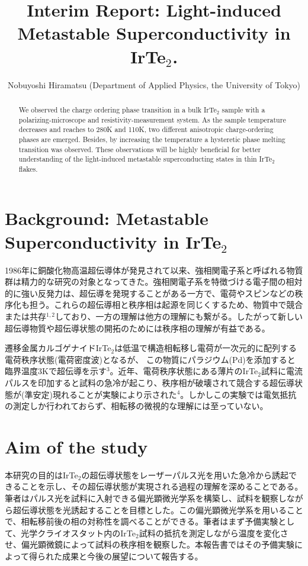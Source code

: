 \documentclass[11pt,a4paper]{article}
\title{\vspace{-1.5zh}Interim Report: Light-induced Metastable Superconductivity in IrTe$_2$.}
\author{\vspace{-2zh}Nobuyoshi Hiramatsu (Department of Applied Physics, the University of Tokyo) }
\date{}
\begin{document}
\maketitle
\thispagestyle{mypagestyle}

\begin{abstract}
We observed the charge ordering phase transition in a bulk IrTe$_2$ sample with a polarizing-microscope and resistivity-measurement system. As the sample temperature decreases and reaches to 280K and 110K, two different anisotropic charge-ordering phases are emerged. Besides, by increasing the temperature a hysteretic phase melting transition was observed. These observations will be highly beneficial for better understanding of the light-induced metastable superconducting states in thin IrTe$_2$ flakes.
\end{abstract}


\section{Background: Metastable Superconductivity in IrTe$_2$}
1986年に銅酸化物高温超伝導体が発見されて以来、強相関電子系と呼ばれる物質群は精力的な研究の対象となってきた。強相関電子系を特徴づける電子間の相対的に強い反発力は、超伝導を発現することがある一方で、電荷やスピンなどの秩序化も担う。これらの超伝導相と秩序相は起源を同じくするため、物質中で競合または共存$^{1,2}$しており、一方の理解は他方の理解にも繋がる。したがって新しい超伝導物質や超伝導状態の開拓のためには秩序相の理解が有益である。

遷移金属カルゴゲナイドIrTe$_2$は低温で構造相転移し電荷が一次元的に配列する電荷秩序状態(電荷密度波)となるが、
この物質にパラジウム(Pd)を添加すると臨界温度3Kで超伝導を示す$^3$。近年、電荷秩序状態にある薄片のIrTe$_2$試料に電流パルスを印加すると試料の急冷が起こり、秩序相が破壊されて競合する超伝導状態が(準安定)現れることが実験により示された$^4$。しかしこの実験では電気抵抗の測定しか行われておらず、相転移の微視的な理解には至っていない。

\section{Aim of the study}
本研究の目的はIrTe$_2$の超伝導状態をレーザーパルス光を用いた急冷から誘起できることを示し、その超伝導状態が実現される過程の理解を深めることである。筆者はパルス光を試料に入射できる偏光顕微光学系を構築し、試料を観察しながら超伝導状態を光誘起することを目標とした。この偏光顕微光学系を用いることで、相転移前後の相の対称性を調べることができる。筆者はまず予備実験として、光学クライオスタット内のIrTe$_2$試料の抵抗を測定しながら温度を変化させ、偏光顕微鏡によって試料の秩序相を観察した。本報告書ではその予備実験によって得られた成果と今後の展望について報告する。
\end{document}
